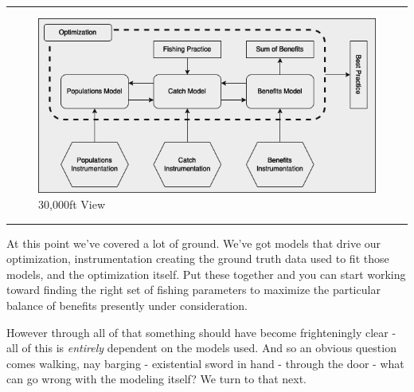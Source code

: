 \documentclass[11pt,a5paper]{book}
\begin{document}
\noindent \rule{\textwidth}{0.5pt} 
\begin{figure}[h!] 
  \includegraphics[width=\linewidth]{drawings/high_level.png}
  \caption{30,000ft View}
  \label{fig:high_level}
\end{figure}
\newline
\rule{\textwidth}{0.5pt} 
\vspace{5pt}

At this point we've covered a lot of ground. We've got models that drive our optimization, instrumentation creating the ground truth data used to fit those models, and the optimization itself. Put these together and you can start working toward finding the right set of fishing parameters to maximize the particular balance of benefits presently under consideration. 
\newline

However through all of that something should have become frighteningly clear - all of this is \textit{entirely} dependent on the models used. And so an obvious question comes walking, nay barging - existential sword in hand - through the door - what can go wrong with the modeling itself? We turn to that next. 
\newpage



\end{document}
